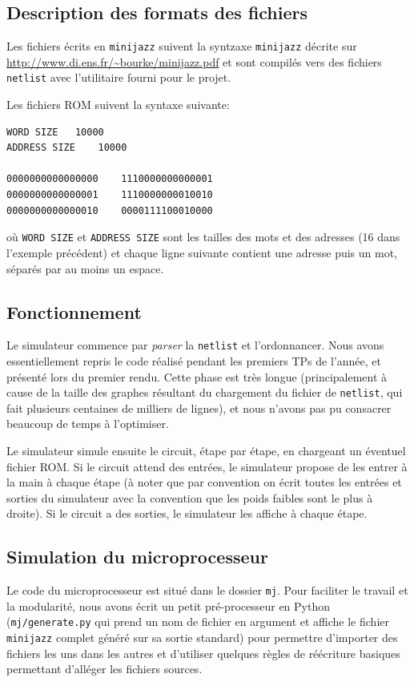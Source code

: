 \documentclass[11pt]{article}
\begin{document}
\subsection{Description des formats des fichiers}

Les fichiers écrits en \texttt{minijazz} suivent la syntzaxe \texttt{minijazz} décrite sur \url{http://www.di.ens.fr/~bourke/minijazz.pdf} et sont compilés vers des fichiers \texttt{netlist} avec l'utilitaire fourni pour le projet.

Les fichiers ROM suivent la syntaxe suivante:
\begin{verbatim}
WORD SIZE	10000
ADDRESS SIZE	10000

0000000000000000	1110000000000001
0000000000000001	1110000000010010
0000000000000010	0000111100010000
\end{verbatim}
où \texttt{WORD SIZE} et \texttt{ADDRESS SIZE} sont les tailles des mots et des adresses (16 dans l'exemple précédent) et chaque ligne suivante contient une adresse puis un mot, séparés par au moins un espace.

\subsection{Fonctionnement}

Le simulateur commence par \emph{parser} la \texttt{netlist} et l'ordonnancer. Nous avons essentiellement repris le code réalisé pendant les premiers TPs de l'année, et présenté lors du premier rendu. Cette phase est très longue (principalement à cause de la taille des graphes résultant du chargement du fichier de \texttt{netlist}, qui fait plusieurs centaines de milliers de lignes), et nous n'avons pas pu consacrer beaucoup de temps à l'optimiser.

Le simulateur simule ensuite le circuit, étape par étape, en chargeant un éventuel fichier ROM. Si le circuit attend des entrées, le simulateur propose de les entrer à la main à chaque étape (à noter que par convention on écrit toutes les entrées et sorties du simulateur avec la convention que les poids faibles sont le plus à droite). Si le circuit a des sorties, le simulateur les affiche à chaque étape.

\subsection{Simulation du microprocesseur}

Le code du microprocesseur est situé dans le dossier \texttt{mj}. Pour faciliter le travail et la modularité, nous avons écrit un petit pré-processeur en Python (\texttt{mj/generate.py} qui prend un nom de fichier en argument et affiche le fichier \texttt{minijazz} complet généré sur sa sortie standard) pour permettre d'importer des fichiers les uns dans les autres et d'utiliser quelques règles de réécriture basiques permettant d'alléger les fichiers sources.
\end{document}
